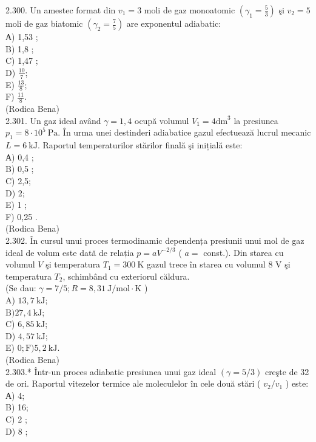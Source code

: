 \documentclass[10pt]{article}
\begin{document}
2.300. Un amestec format din $v_{1}=3$ moli de gaz monoatomic $\left(\gamma_{1}=\frac{5}{3}\right)$ şi $v_{2}=5$ moli de gaz biatomic $\left(\gamma_{2}=\frac{7}{5}\right)$ are exponentul adiabatic:\\
А) 1,53 ;\\
B) 1,8 ;\\
C) 1,47 ;\\
D) $\frac{10}{7}$;\\
E) $\frac{13}{8}$;\\
F) $\frac{11}{8}$.\\
(Rodica Bena)\\
2.301. Un gaz ideal având $\gamma=1,4$ ocupă volumul $V_{1}=4 \mathrm{dm}^{3}$ la presiunea $p_{1}=8 \cdot 10^{5} \mathrm{~Pa}$. În urma unei destinderi adiabatice gazul efectuează lucrul mecanic $L=6 \mathrm{~kJ}$. Raportul temperaturilor stărilor finală şi inițială este:\\
А) 0,4 ;\\
B) 0,5 ;\\
C) 2,5;\\
D) 2;\\
E) 1 ;\\
F) 0,25 .\\
(Rodica Bena)\\
2.302. În cursul unui proces termodinamic dependența presiunii unui mol de gaz ideal de volum este dată de relația $p=a V^{-2 / 3}$ ( $a=$ const.). Din starea cu volumul $V$ şi temperatura $T_{1}=300 \mathrm{~K}$ gazul trece în starea cu volumul 8 V şi temperatura $T_{2}$, schimbând cu exteriorul căldura.\\
(Se dau: $\gamma=7 / 5 ; R=8,31 \mathrm{~J} / \mathrm{mol} \cdot \mathrm{K}$ )\\
A) $13,7 \mathrm{~kJ}$;\\
$\mathrm{B}) 27,4 \mathrm{~kJ}$;\\
C) $6,85 \mathrm{~kJ}$;\\
D) $4,57 \mathrm{~kJ}$;\\
E) $0 ; \mathrm{F}) 5,2 \mathrm{~kJ}$.\\
(Rodica Bena)\\
2.303.* Într-un proces adiabatic presiunea unui gaz ideal $(\gamma=5 / 3)$ creşte de 32 de ori. Raportul vitezelor termice ale moleculelor în cele două stări ( $v_{2} / v_{1}$ ) este:\\
А) 4;\\
B) 16;\\
C) 2 ;\\
D) 8 ;\\
\end{document}
